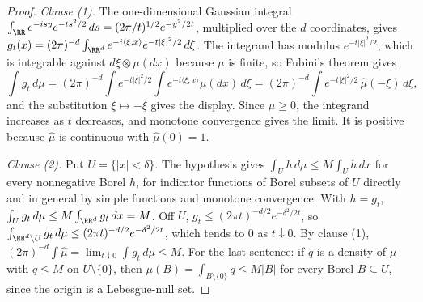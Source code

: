 \begin{proof}
\leanok
\emph{Clause (1).} The one-dimensional Gaussian integral
$\int_{\RR}e^{-isy}e^{-ts^2/2}\,ds = (2\pi/t)^{1/2}e^{-y^2/2t}$, multiplied over the $d$
coordinates, gives $g_t(x) = (2\pi)^{-d}\int_{\RR^d}e^{-i\langle\xi,x\rangle}e^{-t|\xi|^2/2}\,d\xi$.
The integrand has modulus $e^{-t|\xi|^2/2}$, which is integrable against $d\xi \otimes \mu(dx)$
because $\mu$ is finite, so Fubini's theorem gives
\[
  \int g_t\,d\mu = (2\pi)^{-d}\int e^{-t|\xi|^2/2}\int e^{-i\langle\xi,x\rangle}\mu(dx)\,d\xi
   = (2\pi)^{-d}\int e^{-t|\xi|^2/2}\,\widehat\mu(-\xi)\,d\xi ,
\]
and the substitution $\xi \mapsto -\xi$ gives the display. Since $\widehat\mu \ge 0$, the integrand
increases as $t$ decreases, and monotone convergence gives the limit. It is positive because
$\widehat\mu$ is continuous with $\widehat\mu(0) = 1$.

\emph{Clause (2).} Put $U = \{|x| < \delta\}$. The hypothesis gives
$\int_U h\,d\mu \le M\int_U h\,dx$ for every nonnegative Borel $h$, for indicator functions of
Borel subsets of $U$ directly and in general by simple functions and monotone convergence. With
$h = g_t$, $\int_U g_t\,d\mu \le M\int_{\RR^d}g_t\,dx = M$. Off $U$,
$g_t \le (2\pi t)^{-d/2}e^{-\delta^2/2t}$, so
$\int_{\RR^d\setminus U}g_t\,d\mu \le (2\pi t)^{-d/2}e^{-\delta^2/2t}$, which tends to $0$ as
$t \downarrow 0$. By clause (1), $(2\pi)^{-d}\int\widehat\mu = \lim_{t\downarrow0}\int g_t\,d\mu \le
M$. For the last sentence: if $q$ is a density of $\mu$ with $q \le M$ on $U \setminus \{0\}$, then
$\mu(B) = \int_{B\setminus\{0\}}q \le M|B|$ for every Borel $B \subseteq U$, since the origin is a
Lebesgue-null set.
\end{proof}

